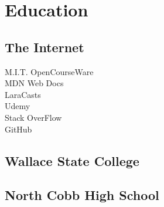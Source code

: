 \documentclass[]{pb-resume}
\begin{document}
\begin{minipage}[t]{0.33\textwidth}

\section{Education} 

\subsection{The Internet}
M.I.T. OpenCourseWare \\
MDN Web Docs \\
LaraCasts \\
Udemy \\
Stack OverFlow \\
GitHub \\

\sectionsep

\subsection{Wallace State College}
\sectionsep

\subsection{North Cobb High School}
\sectionsep

\end{minipage} 
\hfill
\end{document}
